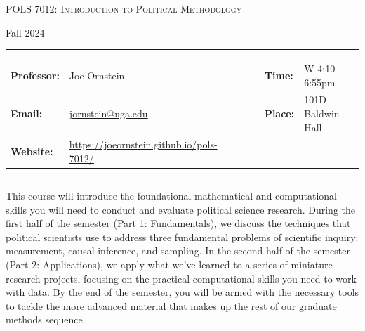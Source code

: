 \documentclass[11pt, letterpaper]{article}
\begin{document}
\begin{center}
{\Large \textsc{POLS 7012: Introduction to Political Methodology}}
\end{center}
\begin{center}
{\large Fall 2024}
\end{center}

\begin{center}
\rule{6.5in}{0.4pt}
\begin{minipage}[t]{.96\textwidth}
\begin{tabular}{llcccll}
\textbf{Professor:} & Joe Ornstein & & &  & \textbf{Time:} & W 4:10 -- 6:55pm \\
\textbf{Email:} &  \href{mailto:jornstein@uga.edu}{jornstein@uga.edu} & & & & \textbf{Place:} & 101D Baldwin Hall\\
\textbf{Website:} & \href{https://joeornstein.github.io/pols-7012/}{https://joeornstein.github.io/pols-7012/} & & & & &
\end{tabular}
\end{minipage}
\rule{6.5in}{0.4pt}
\end{center}
\vspace{.15cm}
\setlength{\unitlength}{1in}
\renewcommand{\arraystretch}{2}



\noindent This course will introduce the foundational mathematical and computational skills you will need to conduct and evaluate political science research. During the first half of the semester (Part 1: Fundamentals), we discuss the techniques that political scientists use to address three fundamental problems of scientific inquiry: measurement, causal inference, and sampling. In the second half of the semester (Part 2: Applications), we apply what we've learned to a series of miniature research projects, focusing on the practical computational skills you need to work with data. By the end of the semester, you will be armed with the necessary tools to tackle the more advanced material that makes up the rest of our graduate methods sequence. %
\end{document}
